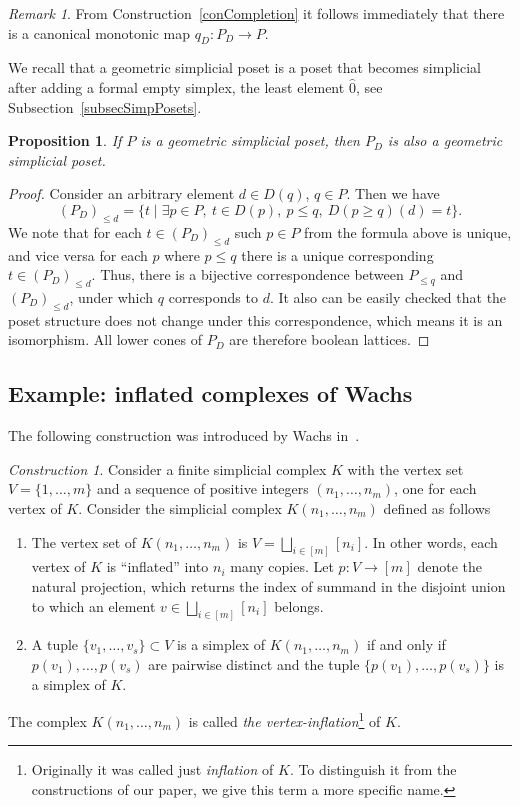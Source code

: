 \documentclass[english,12pt,oneside]{amsproc}
\newcounter{stmcounter}[section]
\numberwithin{equation}{section}
\theoremstyle{plain}
\newtheorem{prop}[stmcounter]{Proposition}
\theoremstyle{definition}
\theoremstyle{remark}
\newtheorem{rem}[stmcounter]{Remark}
\newtheorem{con}[stmcounter]{Construction}
\begin{document}
\begin{rem}\label{remMapQd}
From Construction~\ref{conCompletion} it follows immediately that there is a canonical monotonic map $q_D\colon P_D\to P$.
\end{rem}

We recall that a geometric simplicial poset is a poset that becomes simplicial after adding a formal empty simplex, the least element $\hat{0}$, see Subsection~\ref{subsecSimpPosets}.

\begin{prop}
If $P$ is a geometric simplicial poset, then $P_D$ is also a geometric simplicial poset.
\end{prop}

\begin{proof}
Consider an arbitrary element $d\in D(q)$, $q\in P$. Then we have
\[
(P_{D})_{\leqslant d} = \{t\mid \exists p\in P,\: t\in D(p),\: p\leq q,\: D(p\geq q)(d)=t\}.
\]
We note that for each $t\in (P_{D})_{\leqslant d}$ such $p\in P$ from the formula above is unique, and vice versa for each $p$ where $p\leq q$ there is a unique corresponding $t\in (P_{D})_{\leqslant d}$. Thus, there is a bijective correspondence between $P_{\leqslant q}$ and $(P_{D})_{\leqslant d}$, under which $q$ corresponds to $d$. It also can be easily checked that the poset structure does not change under this correspondence, which means it is an isomorphism. All lower cones of $P_D$ are therefore boolean lattices.
\end{proof}

\subsection{Example: inflated complexes of Wachs}

The following construction was introduced by Wachs in~\cite{Wachs}.

\begin{con}
Consider a finite simplicial complex $K$ with the vertex set $V=\{1,\ldots,m\}$ and a sequence of positive integers $(n_1,\ldots, n_m)$, one for each vertex of $K$. Consider the simplicial complex $K(n_1,\ldots,n_m)$ defined as follows
\begin{enumerate}
  \item The vertex set of $K(n_1,\ldots,n_m)$ is $V=\bigsqcup_{i\in[m]}[n_i]$. In other words, each vertex of $K$ is ``inflated'' into $n_i$ many copies. Let $p\colon V\to [m]$ denote the natural projection, which returns the index of summand in the disjoint union to which an element $v\in \bigsqcup_{i\in[m]}[n_i]$ belongs.
  \item A tuple $\{v_1,\ldots,v_s\}\subset V$ is a simplex of $K(n_1,\ldots,n_m)$ if and only if $p(v_1),\ldots,p(v_s)$ are pairwise distinct and the tuple $\{p(v_1),\ldots,p(v_s)\}$ is a simplex of $K$.
\end{enumerate}
The complex $K(n_1,\ldots,n_m)$ is called \emph{the vertex-inflation}\footnote{Originally it was called just \emph{inflation} of $K$. To distinguish it from the constructions of our paper, we give this term a more specific name.} of $K$.
\end{con}
\end{document}
